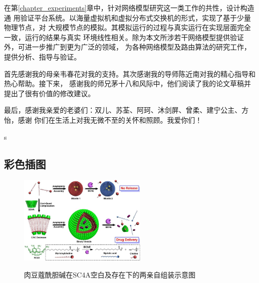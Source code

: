 \documentclass[bachelor,winfonts]{jnuthesis} %
\begin{document}
    在第\ref{chapter_experiments}章中，针对网络模型研究这一类工作的共性，设计构造通
    用验证平台系统。以海量虚拟机和虚拟分布式交换机的形式，实现了基于少量物理节点，对
    大规模节点的模拟。其模拟运行的过程与真实运行在实现层面完全一致，运行的结果与真实
    环境线性相关。除为本文所涉若干网络模型提供验证外，可进一步推广到更为广泛的领域，
    为各种网络模型及路由算法的研究工作，提供分析、指导与验证。
    
    

    \begin{acknowledgement}
        首先感谢我的母亲韦春花对我的支持。其次感谢我的导师陈近南对我的精心指导和热心帮助。接下来，
        感谢我的师兄茅十八和风际中，他们阅读了我的论文草稿并提出了很有价值的修改建议。
        
        最后，感谢我亲爱的老婆们：双儿、苏荃、阿珂、沐剑屏、曾柔、建宁公主、方怡，感谢
        你们在生活上对我无微不至的关怀和照顾。我爱你们！
    \end{acknowledgement}
    s
    \begin{appendix}
    \chapter{彩色插图}
    \begin{figure}[htbp]
        \centering
        \includegraphics[width= 0.55\textwidth]{Figure/Ch1-SC4A}\\
        \caption{肉豆蔻酰胆碱在SC4A空白及存在下的两亲自组装示意图}
    \end{figure}
    \end{appendix}
\end{document}
